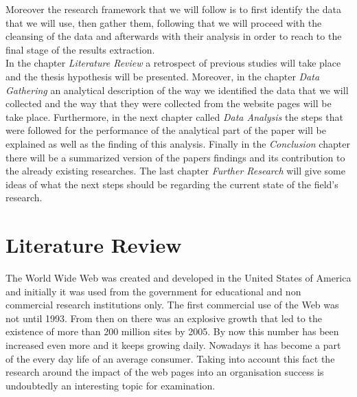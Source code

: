 \documentclass{book}
\begin{document}
Moreover the research framework that we will follow is to first identify the data that we will use, then gather them, following that we will proceed with the cleansing of the data and afterwards with their analysis in order to reach to the final stage of the results extraction.\\
In the chapter \textit{Literature Review} a retrospect of previous studies will take place and the thesis hypothesis will be presented. Moreover, in the chapter \textit{Data Gathering} an analytical description of the way we identified the data that we will collected and the way that they were collected from the website pages will be take place. Furthermore, in the next chapter called \textit{Data Analysis} the steps that were followed for the performance of the analytical part of the paper will be explained as well as the finding of this analysis. Finally in the \textit{Conclusion} chapter there will be a summarized version of the papers findings and its contribution to the already existing researches. The last chapter \textit{Further Research} will give some ideas of what the next steps should be regarding the current state of the field's research.
\newpage
\chapter{Literature Review }
The World Wide Web was created and developed in the United States of America and initially it was used from the government for educational and non commercial research institutions only. The first commercial use of the Web was not until 1993.\cite{key1} From then on there was an explosive growth that led to the existence of more than 200 million sites by 2005.\cite{key3} By now this number has been increased even more and it keeps growing daily. Nowadays it has become a part of the every day life of an average consumer. Taking into account this fact the research around the impact of the web pages into an organisation success is undoubtedly an interesting topic for examination.
\end{document}

